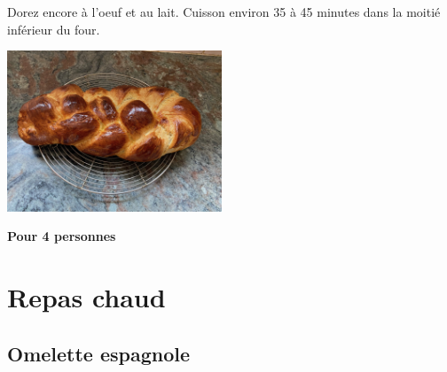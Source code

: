 \documentclass[10pt,a4paper]{report}
\begin{document}
\begin{multicols}{2}
        Dorez encore à l'oeuf et au lait. Cuisson environ 35 à 45 minutes dans la moitié inférieur du four.
        \centerline{\includegraphics[width=0.48\textwidth]{./assets/tresse_du_dimanche_5}}
        \newline
        \newline
        \textbf{Pour 4 personnes}
    \end{multicols}

    \chapter{Repas chaud}
    \newpage

    \section{Omelette espagnole}
\end{document}
